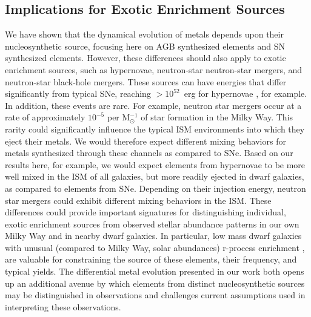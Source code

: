 \subsection{Implications for Exotic Enrichment Sources}
\label{sec:exotic enrichment}
We have shown that the dynamical evolution of metals depends upon their nucleosynthetic source, focusing here on AGB synthesized elements and SN synthesized elements. However, these differences should also apply to exotic enrichment sources, such as hypernovae, neutron-star neutron-star mergers, and neutron-star black-hole mergers. These sources can have energies that differ significantly from typical SNe, reaching $> 10^{52}$~erg for hypernovae \citep{Nomoto2004}, for example. In addition, 
     these events are rare.  For example, neutron star mergers occur 
     at a rate of approximately $10^{-5}$ per M$_{\odot}^{-1}$ of star
     formation in the Milky Way\citep{Kim2015}.  This rarity could 
significantly influence the typical ISM environments into which they eject their metals. We would therefore expect different mixing behaviors for metals synthesized through these channels as compared to SNe. Based on our results here, for example, we would expect elements from hypernovae to be more well mixed in the ISM of all galaxies, but more readily ejected in dwarf galaxies, as compared to elements from SNe. 
Depending on their injection energy, neutron star mergers could exhibit different mixing behaviors in the ISM. These differences could provide important signatures for distinguishing individual, exotic enrichment sources from observed stellar abundance patterns in our own Milky Way and in nearby dwarf galaxies. In particular, low mass dwarf galaxies with unusual (compared to Milky Way, solar abundances) r-process enrichment \citep[e.g.][]{Ji2016,Ji2018,Duggan2018}, are valuable for constraining the source of these elements, their frequency, and typical yields. The differential metal evolution presented in our work both opens up an additional avenue by which elements from distinct nucleosynthetic sources may be distinguished in observations and challenges current assumptions used in interpreting these observations.

